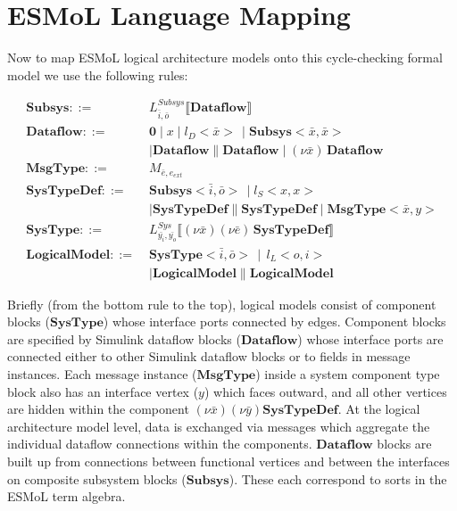 \section{ ESMoL Language Mapping }
\label{section:esmol}

Now to map ESMoL logical architecture models onto this cycle-checking
formal model we use the following rules:

\begin{align}
\mathbf{Subsys} ::=\; & L_{\bar{i},\bar{o}}^{Subsys} \llbracket \mathbf{Dataflow} \rrbracket \nonumber \\
\mathbf{Dataflow} ::=\; & \mathbf{0} \mid x \mid l_D <\bar{x}>\, \mid \mathbf{Subsys} <\bar{x}, \bar{x} > \nonumber \\
 & \mid \mathbf{Dataflow} \parallel \mathbf{Dataflow} \mid (\nu \bar{x}) \, \mathbf{Dataflow} \nonumber \\
\mathbf{MsgType} ::=\; & M_{\bar{e},e_{ext}} \\
\mathbf{SysTypeDef} ::=\; & \mathbf{Subsys} <\bar{i},\bar{o}> \, \mid l_S <x,x> \nonumber \\
 & \mid \mathbf{SysTypeDef} \parallel \mathbf{SysTypeDef} \mid \mathbf{MsgType} <\bar{x},y> \nonumber \\
\mathbf{SysType} ::=\; & L_{\bar{y_i},\bar{y_o}}^{Sys} \llbracket (\nu \bar{x})(\nu \bar{e}) \, \mathbf{SysTypeDef} \rrbracket \nonumber \\
\mathbf{LogicalModel} ::=\; & \mathbf{SysType} <\bar{i},\bar{o}>\, \mid \, l_L <o,i>  \nonumber \\
 & \mid \mathbf{LogicalModel} \parallel \mathbf{LogicalModel} \nonumber
\end{align}

Briefly (from the bottom rule to the top), logical 
models consist of component blocks ($\mathbf{SysType}$) 
whose interface ports connected by edges.  Component 
blocks are specified by Simulink dataflow blocks 
($\mathbf{Dataflow}$) whose interface ports are 
connected either to other Simulink dataflow blocks 
or to fields in message instances. Each message 
instance ($\mathbf{MsgType}$) inside a system component 
type block also has an interface vertex ($y$) which
faces outward, and all other vertices are hidden within 
the component $(\nu \bar{x})(\nu \bar{y}) \mathbf{SysTypeDef}$.  
At the logical architecture model level, data is 
exchanged via messages which aggregate the individual 
dataflow connections within the components.  
$\mathbf{Dataflow}$ blocks are built up from connections 
between functional vertices and between the interfaces 
on composite subsystem blocks ($\mathbf{Subsys}$).  
These each correspond to sorts in the ESMoL term algebra.

